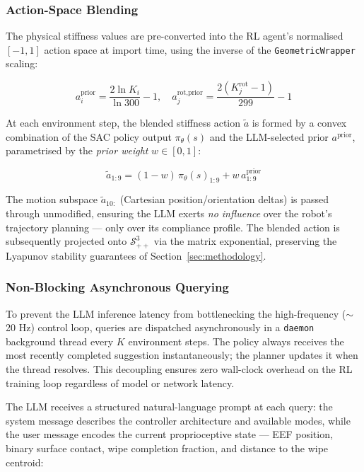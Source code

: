 \documentclass[letterpaper, 10 pt, conference]{IEEEtran}
\begin{document}
\subsubsection{Action-Space Blending}
The physical stiffness values are pre-converted into the
RL agent's normalised $[-1, 1]$ action space at import time, using the inverse
of the \texttt{GeometricWrapper} scaling:

\begin{equation}
    a_i^{\text{prior}} = \frac{2\ln K_i}{\ln 300} - 1, \quad
    a_j^{\text{rot,prior}} = \frac{2(K_j^{\text{rot}} - 1)}{299} - 1
\end{equation}

At each environment step, the blended stiffness action $\tilde{a}$ is formed by a
convex combination of the SAC policy output $\pi_\theta(s)$ and the LLM-selected
prior $a^{\text{prior}}$, parametrised by the \textit{prior weight} $w \in [0,1]$:

\begin{equation}
    \tilde{a}_{1:9} = (1 - w)\,\pi_\theta(s)_{1:9} + w\,a^{\text{prior}}_{1:9}
    \label{eq:blending}
\end{equation}

The motion subspace $\tilde{a}_{10:}$ (Cartesian position/orientation deltas)
is passed through unmodified, ensuring the LLM exerts \textit{no influence} over
the robot's trajectory planning — only over its compliance profile.
The blended action is subsequently projected onto $\mathcal{S}_{++}^3$ via the
matrix exponential, preserving the Lyapunov stability guarantees of
Section~\ref{sec:methodology}.

\subsubsection{Non-Blocking Asynchronous Querying}
To prevent the LLM inference latency from bottlenecking the high-frequency
($\sim$20 Hz) control loop, queries are dispatched asynchronously in a
\texttt{daemon} background thread every $K$ environment steps. The policy
always receives the most recently completed suggestion instantaneously;
the planner updates it when the thread resolves. This decoupling ensures
zero wall-clock overhead on the RL training loop regardless of model
or network latency.

The LLM receives a structured natural-language prompt at each query:
the system message describes the controller architecture and available modes,
while the user message encodes the current proprioceptive state —
EEF position, binary surface contact, wipe completion fraction, and
distance to the wipe centroid:
\end{document}
